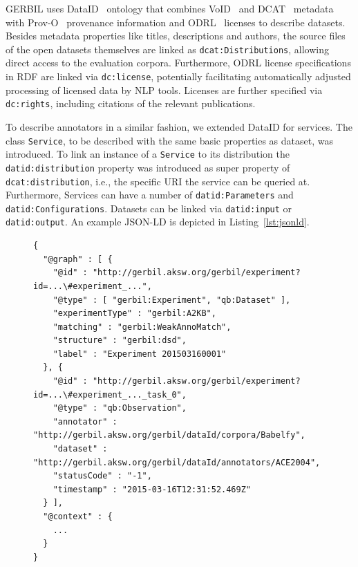 GERBIL uses DataID~\cite{dataID} ontology that combines VoID~\cite{void} and DCAT~\cite{dcat} metadata with Prov-O~\cite{prov-o} provenance information and ODRL~\cite{odrl} licenses to describe datasets.
Besides metadata properties like titles, descriptions and authors, the source files of the open datasets themselves are linked as \texttt{dcat:Distributions}, allowing direct access to the evaluation corpora. 
Furthermore, ODRL license specifications in \ac{RDF} are linked via \texttt{dc:license}, potentially facilitating automatically adjusted processing of licensed data by \ac{NLP} tools. 
Licenses are further specified via \texttt{dc:rights}, including citations of the relevant publications. 

To describe annotators in a similar fashion, we extended DataID for services. 
The class \texttt{Service}, to be described with the same basic properties as dataset, was introduced. 
To link an instance of a \texttt{Service} to its distribution the \texttt{datid:distribution} property was introduced as super property of \texttt{dcat:distribution}, i.e., the specific URI the service can be queried at.
Furthermore, Services can have a number of \texttt{datid:Parameters} and \texttt{datid:Configurations}.
Datasets can be linked via \texttt{datid:input} or \texttt{datid:output}. 
An example JSON-LD is depicted in Listing~\ref{lst:jsonld}.


\begin{figure}[ht!]
\begin{lstlisting}[label=lst:jsonld, caption=Example JSON-LD for an GERBIL experiment.]
{
  "@graph" : [ {
    "@id" : "http://gerbil.aksw.org/gerbil/experiment?id=...\#experiment_...",
    "@type" : [ "gerbil:Experiment", "qb:Dataset" ],
    "experimentType" : "gerbil:A2KB",
    "matching" : "gerbil:WeakAnnoMatch",
    "structure" : "gerbil:dsd",
    "label" : "Experiment 201503160001"
  }, {
    "@id" : "http://gerbil.aksw.org/gerbil/experiment?id=...\#experiment_..._task_0",
    "@type" : "qb:Observation",
    "annotator" : "http://gerbil.aksw.org/gerbil/dataId/corpora/Babelfy",
    "dataset" : "http://gerbil.aksw.org/gerbil/dataId/annotators/ACE2004",
    "statusCode" : "-1",
    "timestamp" : "2015-03-16T12:31:52.469Z"
  } ],
  "@context" : {
    ...
  }
}
\end{lstlisting}
\end{figure}


